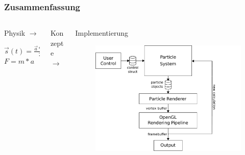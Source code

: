 \documentclass{beamer}
\begin{document}
\begin{frame}
\frametitle{Zusammenfassung}
\begin{columns}[T] %
\begin{column}{.33\textwidth}
Physik $\rightarrow$ \linebreak
\linebreak

\tiny$\overrightarrow{s}(t) = \frac{\overrightarrow{a}*t^2}{2} + C_v + C_s$
\linebreak
\linebreak
\linebreak
\linebreak
\tiny$F= m*a$




\end{column}%
\hfill%
\begin{column}{.33\textwidth}

Konzepte $\rightarrow$ \linebreak
\linebreak
\end{column}%
\begin{column}{.33\textwidth}

Implementierung\linebreak
\linebreak
\begin{figure}[]
\centering
\includegraphics[width=\textwidth]{../images/system-diagram-no-shaders.pdf}
\end{figure}

\end{column}%
\end{columns}
\end{frame}
\end{document}
